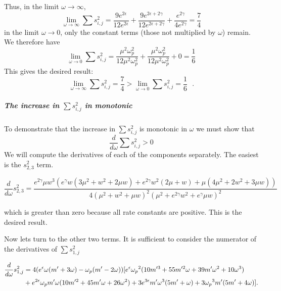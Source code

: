 Thus, in the limit  $\omega\to\infty$,%
\[
\lim_{\omega\to\infty}\sum{s^2_{i,j}} = \frac{9e^{2\epsilon}}{12e^{2\epsilon}}+\frac{9e^{2\epsilon+2\gamma}}{12e^{2\epsilon+2\gamma}}+\frac{e^{2\gamma}}{4e^{2\gamma}}=\frac{7}{4}
\]
in the limit  $\omega\to0$, only the constant terms (those not multiplied by $\omega$) remain.  We therefore have %
\[
\lim_{\omega\to0}\sum{s^2_{i,j}} = \frac{\mu^2 \omega_p^2}{12\mu^2 \omega_p^2}+\frac{\mu^2 \omega_p^2}{12\mu^2 \omega_p^2}+0=\frac{1}{6}
\]
This gives the desired result:
\[
\lim_{\omega\to\infty}\sum{s^2_{i,j}}=\frac{7}{4}>\lim_{\omega\to0}\sum{s^2_{i,j}}=\frac{1}{6} \ \ \ .
\]
\subparagraph{The increase in $\sum{s^2_{i,j}}$ in monotonic}
To demonstrate that the increase in  $\sum{s^2_{i,j}}$ is monotonic in $\omega$ we must show that 
\[
\frac{d}{d\omega}\sum{s^2_{i,j}}>0
\]
We will compute the derivatives of each of the components separately.  The easiest is the $s^2_{2,3}$ term.%
\begin{widetext}
\[
\frac{d}{d\omega}{s^2_{2,3}}=\frac{e^{2 \gamma } \mu  w^3 \left(e^{\gamma } w \left(3 \mu ^2+w^2+2 \mu  w\right)+e^{2 \gamma } w^2 (2 \mu +w)+\mu  \left(4 \mu ^2+2 w^2+3 \mu  w\right)\right)}{4 \left(\mu ^2+w^2+\mu  w\right)^2 \left(\mu ^2+e^{2 \gamma } w^2+e^{\gamma } \mu  w\right)^2}
\]
\end{widetext}
which is greater than zero because all rate constants are positive.  This is the desired result.

Now lets turn to the other two terms.  It is sufficient to consider the numerator of the derivatives of $\sum{s^2_{1,j}}$
\begin{widetext}
\[
\begin{aligned}
\frac{d}{d\omega}{s^2_{1,j}} &= 4 (e^\epsilon \omega (m'+3 \omega)-{\omega_p} (m'-2 \omega)) [e^\epsilon {\omega_p}^2 (10 m'^3+55 m'^2 \omega+39 m' \omega^2+10\omega^3)\\
   &+ e^{2 \epsilon} {\omega_p} m' \omega (10 m'^2+45 m' \omega+26 \omega^2)+3 e^{3 \epsilon} m' \omega^3 (5 m'+\omega)+3
   {\omega_p}^3 m' (5 m'+4 \omega)].
\end{aligned}
\]
\end{widetext}

